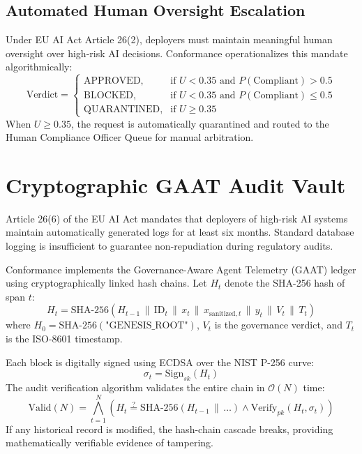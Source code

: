 \documentclass[conference,10pt]{IEEEtran}
\begin{document}
\subsection{Automated Human Oversight Escalation}
Under EU AI Act Article 26(2), deployers must maintain meaningful human oversight over high-risk AI decisions. Conformance operationalizes this mandate algorithmically:
\begin{equation}
    \text{Verdict} = 
    \begin{cases}
        \text{APPROVED}, & \text{if } U < 0.35 \text{ and } P(\text{Compliant}) > 0.5 \\
        \text{BLOCKED}, & \text{if } U < 0.35 \text{ and } P(\text{Compliant}) \le 0.5 \\
        \text{QUARANTINED}, & \text{if } U \ge 0.35
    \end{cases}
\end{equation}
When $U \ge 0.35$, the request is automatically quarantined and routed to the Human Compliance Officer Queue for manual arbitration.

\section{Cryptographic GAAT Audit Vault}
\label{sec:vault}

Article 26(6) of the EU AI Act mandates that deployers of high-risk AI systems maintain automatically generated logs for at least six months. Standard database logging is insufficient to guarantee non-repudiation during regulatory audits.

Conformance implements the Governance-Aware Agent Telemetry (GAAT) ledger using cryptographically linked hash chains. Let $H_t$ denote the SHA-256 hash of span $t$:
\begin{equation}
    H_t = \text{SHA-256}\left( H_{t-1} \,\|\, \text{ID}_t \,\|\, x_t \,\|\, x_{\text{sanitized}, t} \,\|\, y_t \,\|\, V_t \,\|\, T_t \right)
\end{equation}
where $H_0 = \text{SHA-256}(\text{"GENESIS\_ROOT"})$, $V_t$ is the governance verdict, and $T_t$ is the ISO-8601 timestamp.

Each block is digitally signed using ECDSA over the NIST P-256 curve:
\begin{equation}
    \sigma_t = \text{Sign}_{sk}(H_t)
\end{equation}
The audit verification algorithm validates the entire chain in $\mathcal{O}(N)$ time:
\begin{equation}
    \text{Valid}(N) = \bigwedge_{t=1}^{N} \left( H_t \stackrel{?}{=} \text{SHA-256}(H_{t-1} \,\|\, \dots) \land \text{Verify}_{pk}(H_t, \sigma_t) \right)
\end{equation}
If any historical record is modified, the hash-chain cascade breaks, providing mathematically verifiable evidence of tampering.
\end{document}
